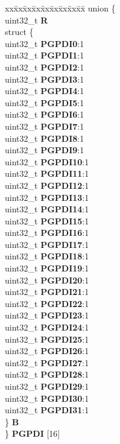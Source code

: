 \begin{DoxyCompactItemize}
\begin{tabbing}
\end{tabbing}\item 
\mbox{\label{structSIU__tag_a21bf5792ee7043fa5240fd640cc18029}} 
\begin{tabbing}
xx\=xx\=xx\=xx\=xx\=xx\=xx\=xx\=xx\=\kill
union \{\\
\>uint32\_t {\bfseries R}\\
\>struct \{\\
\>\>uint32\_t {\bfseries PGPDI0}:1\\
\>\>uint32\_t {\bfseries PGPDI1}:1\\
\>\>uint32\_t {\bfseries PGPDI2}:1\\
\>\>uint32\_t {\bfseries PGPDI3}:1\\
\>\>uint32\_t {\bfseries PGPDI4}:1\\
\>\>uint32\_t {\bfseries PGPDI5}:1\\
\>\>uint32\_t {\bfseries PGPDI6}:1\\
\>\>uint32\_t {\bfseries PGPDI7}:1\\
\>\>uint32\_t {\bfseries PGPDI8}:1\\
\>\>uint32\_t {\bfseries PGPDI9}:1\\
\>\>uint32\_t {\bfseries PGPDI10}:1\\
\>\>uint32\_t {\bfseries PGPDI11}:1\\
\>\>uint32\_t {\bfseries PGPDI12}:1\\
\>\>uint32\_t {\bfseries PGPDI13}:1\\
\>\>uint32\_t {\bfseries PGPDI14}:1\\
\>\>uint32\_t {\bfseries PGPDI15}:1\\
\>\>uint32\_t {\bfseries PGPDI16}:1\\
\>\>uint32\_t {\bfseries PGPDI17}:1\\
\>\>uint32\_t {\bfseries PGPDI18}:1\\
\>\>uint32\_t {\bfseries PGPDI19}:1\\
\>\>uint32\_t {\bfseries PGPDI20}:1\\
\>\>uint32\_t {\bfseries PGPDI21}:1\\
\>\>uint32\_t {\bfseries PGPDI22}:1\\
\>\>uint32\_t {\bfseries PGPDI23}:1\\
\>\>uint32\_t {\bfseries PGPDI24}:1\\
\>\>uint32\_t {\bfseries PGPDI25}:1\\
\>\>uint32\_t {\bfseries PGPDI26}:1\\
\>\>uint32\_t {\bfseries PGPDI27}:1\\
\>\>uint32\_t {\bfseries PGPDI28}:1\\
\>\>uint32\_t {\bfseries PGPDI29}:1\\
\>\>uint32\_t {\bfseries PGPDI30}:1\\
\>\>uint32\_t {\bfseries PGPDI31}:1\\
\>\} {\bfseries B}\\
\} {\bfseries PGPDI} \mbox{[}16\mbox{]}\\


\end{tabbing}
\end{DoxyCompactItemize}
